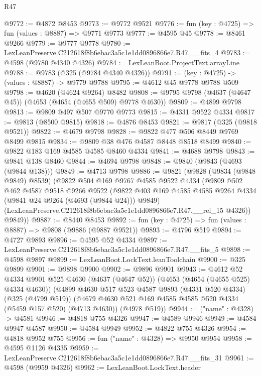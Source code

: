 \begin{lexlean}{R47}
\begin{coremodule}
@9772 := @4872 @8453
@9773 := @9772 @9521
@9776 := fun (key : @4725) => fun (values : @8887) => @9771 @9773
@9777 := @4595 @45
@9778 := @8461 @9266
@9779 := @9777 @9778
@9780 := LexLeanPreserve.C212618f8b6ebac3a5c1e1dd0896866e7.R47.__fits_4
@9783 := @4598 (@9780 @4340 @4326)
@9784 := LexLeanBoot.ProjectText.arrayLine
@9788 := @9783 (@325 (@9784 @4340 @4326))
@9791 := (key : @4725) -> (values : @8887) -> @9779 @9788
@9795 := @4612 @45 @9778 @9788 @509
@9798 := @4620 (@4624 @9264) @8482
@9808 := @9795 @9798 (@4637 (@4647 @45)) (@4653 (@4654 (@4655 @509) @9778 @4630))
@9809 := @4899 @9798
@9813 := @9809 @497 @507 @9770 @9773
@9815 := @4331 @9522 @4334
@9817 := @9813 (@8500 @9815)
@9818 := @4876 @8453
@9821 := @9817 (@325 (@9818 @9521))
@9822 := @4679 @9798
@9828 := @9822 @477 @506 @8449 @9769 @8499 @9815
@9834 := @9809 @38 @476 @4587 @8448 @8518 @8499
@9840 := @9822 @183 @169 @4585 @4585 @8460 @4334
@9841 := @4688 @9798
@9843 := @9841 @138 @8460
@9844 := @4694 @9798
@9848 := @9840 (@9843 (@4693 (@9844 @138)))
@9849 := @4713 @9798
@9886 := @9821
    (@9828
      (@9834 (@9848 @9849) @8539)
      (@9822
        @504
        @169
        @9767
        @4585
        @9522
        @4334
        (@9809
          @502
          @462
          @4587
          @9518
          @9266
          @9522
          (@9822 @403 @169 @4585 @4585 @9264 @4334 (@9841 @24 @9264 (@4693 (@9844 @24))) @9849)
          (LexLeanPreserve.C212618f8b6ebac3a5c1e1dd0896866e7.R47.__rel_15 @4326))
        @9849))
@9887 := @8440 @8453
@9892 := fun (key : @4725) => fun (values : @8887) => @9808 (@9886 (@9887 @9521))
@9893 := @4796 @519
@9894 := @4727 @9893
@9896 := @4595 @52 @4334
@9897 := LexLeanPreserve.C212618f8b6ebac3a5c1e1dd0896866e7.R47.__fits_5
@9898 := @4598 @9897
@9899 := LexLeanBoot.LockText.leanToolchain
@9900 := @325 @9899
@9901 := @9898 @9900
@9902 := @9896 @9901
@9943 := @4612
    @52
    @4334
    @9901
    @525
    @4630
    (@4637 (@4647 @52))
    (@4653 (@4654 (@4655 @525) @4334 @4630))
    (@4899
      @4630
      @517
      @523
      @4587
      @9893
      (@4331 @520 @4334)
      (@325 (@4799 @519))
      (@4679 @4630 @521 @169 @4585 @4585 @520 @4334 (@5459 @157 @520) (@4713 @4630))
      (@4978 @519))
@9944 := ("name" : @4328) -> @4581
@9946 := @4818 @755 @4326
@9947 := @4589 @9946
@9949 := @4584 @9947 @4587
@9950 := @4584 @9949
@9952 := @4822 @755 @4326
@9954 := @4818 @9952 @755
@9956 := fun ("name" : @4328) => @9950 @9954
@9958 := @4595 @1126 @4335
@9959 := LexLeanPreserve.C212618f8b6ebac3a5c1e1dd0896866e7.R47.__fits_31
@9961 := @4598 (@9959 @4326)
@9962 := LexLeanBoot.LockText.header

\end{coremodule}
\end{lexlean}
